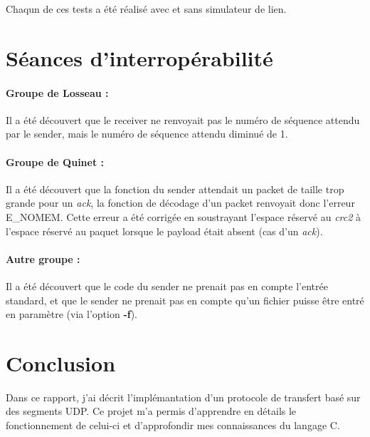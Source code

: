 \documentclass[10pt,a4paper]{article}
\begin{document}
Chaqun de ces tests a été réalisé avec et sans simulateur de lien.

\section{Séances d'interropérabilité \label{sec:interop}}

\paragraph{Groupe de Losseau :} Il a été découvert que le receiver ne renvoyait pas le numéro de séquence attendu par le sender, mais le numéro de séquence attendu diminué de 1.

\paragraph{Groupe de Quinet : } Il a été découvert que la fonction du sender attendait un packet de taille trop grande pour un \textit{ack}, la fonction de décodage d'un packet renvoyait donc l'erreur E\_NOMEM. Cette erreur a été corrigée en soustrayant l'espace réservé au \textit{crc2} à l'espace réservé au paquet lorsque le payload était absent (cas d'un \textit{ack}).

\paragraph{Autre groupe : } Il a été découvert que le code du sender ne prenait pas en compte l'entrée standard, et que le sender ne prenait pas en compte qu'un fichier puisse être entré en paramètre (via l'option \textbf{-f}).

\section{Conclusion}
Dans ce rapport, j'ai décrit l'implémantation d'un protocole de transfert basé sur des segments UDP. Ce projet m'a permis d'apprendre en détails le fonctionnement de celui-ci et d'approfondir mes connaissances du langage C. 
\end{document}
